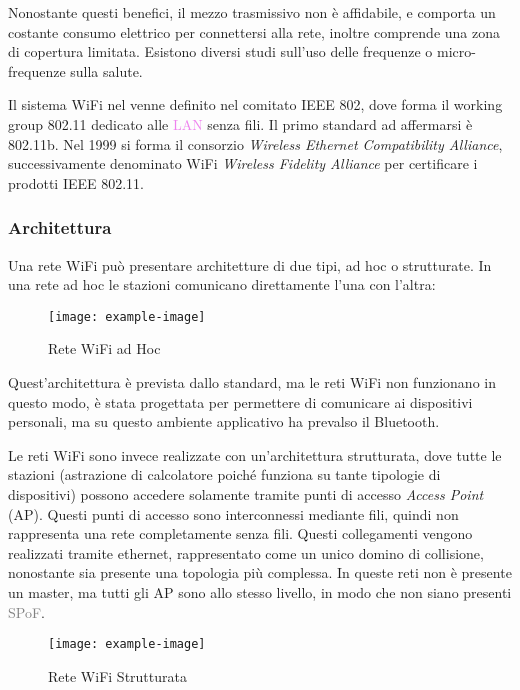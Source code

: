 \documentclass{article}
\numberwithin{equation}{subsection}
\begin{document}
Nonostante questi benefici, il mezzo trasmissivo non è affidabile, e comporta un costante consumo elettrico per connettersi alla rete, inoltre comprende una zona di copertura limitata. Esistono diversi studi sull'uso delle frequenze o micro-frequenze sulla salute. 

Il sistema \textcolor{Sepia}{WiFi} nel venne definito nel comitato IEEE 802, dove forma il working group 802.11 dedicato alle \textcolor{violet}{LAN} senza fili. Il primo standard ad affermarsi è 802.11b. 
Nel 1999 si forma il consorzio \textit{Wireless Ethernet Compatibility Alliance}, successivamente denominato \textcolor{Sepia}{WiFi} \textit{Wireless Fidelity Alliance} per certificare i prodotti 
IEEE 802.11. 

\subsubsection{Architettura}

Una rete \textcolor{Sepia}{WiFi} può presentare architetture di due tipi, ad hoc o strutturate. In una rete ad hoc le stazioni comunicano direttamente l'una con l'altra:

\begin{figure}[H]%
    \centering%
    \texttt{[image: example-image]}%
    \caption{Rete \textcolor{Sepia}{WiFi} ad Hoc}%
\end{figure}

Quest'architettura è prevista dallo standard, ma le reti \textcolor{Sepia}{WiFi} non funzionano in questo modo, è stata progettata per permettere di comunicare ai 
dispositivi personali, ma su questo ambiente applicativo ha prevalso il Bluetooth. 

Le reti \textcolor{Sepia}{WiFi} sono invece realizzate con un'architettura strutturata, dove tutte le stazioni (astrazione di calcolatore poiché funziona su tante tipologie di dispositivi) possono accedere 
solamente tramite punti di accesso \textit{Access Point} (\textcolor{PineGreen}{AP}). Questi punti di accesso sono interconnessi mediante fili, quindi non rappresenta una rete completamente senza fili. 
Questi collegamenti vengono realizzati tramite ethernet, rappresentato come un unico domino di collisione, nonostante sia presente una topologia più complessa. 
In queste reti non è presente un master, ma tutti gli \textcolor{PineGreen}{AP} sono allo stesso livello, in modo che non siano presenti \textcolor{gray}{SPoF}. 


\begin{figure}[H]%
    \centering%
    \texttt{[image: example-image]}%
    \caption{Rete \textcolor{Sepia}{WiFi} Strutturata}%
\end{figure}
\end{document}
